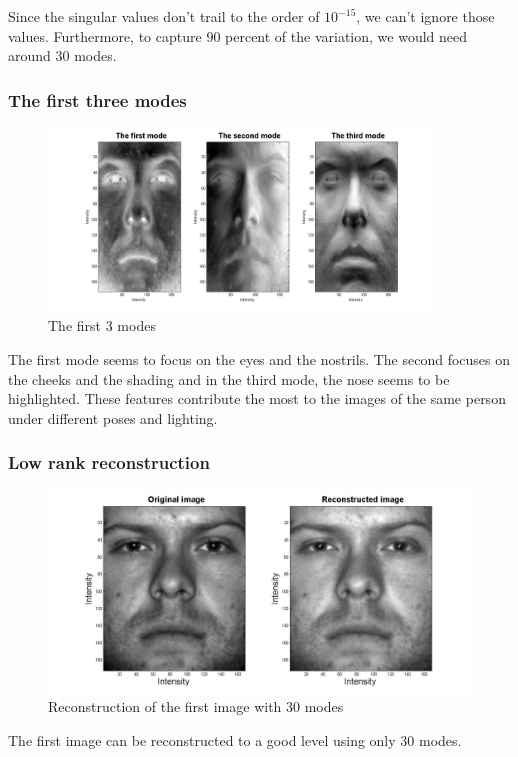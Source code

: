 \documentclass[a4paper]{article}
\begin{document}
Since the singular values don't trail to the order of $10^{-15}$, we can't ignore those values. Furthermore, to capture 90 percent of the variation, we would need around 30 modes.

\subsubsection{The first three modes}
\begin{figure}[h!] 
	
	\includegraphics[width=0.91\textwidth]{modescrop1.jpg}
	
	\caption{The first 3 modes}	
\end{figure}
The first mode seems to focus on the eyes and the nostrils. The second focuses on the cheeks and the shading and in the third mode, the nose seems to be highlighted. These features contribute the most to the images of the same person under different poses and lighting.

\subsubsection{Low rank reconstruction}
\begin{figure}[H] 
	
	\includegraphics[width=1.\textwidth]{reconcrop130.jpg}
	
	\caption{Reconstruction of the first image with 30 modes}	
\end{figure}
The first image can be reconstructed to a good level using only 30 modes.
\end{document}

